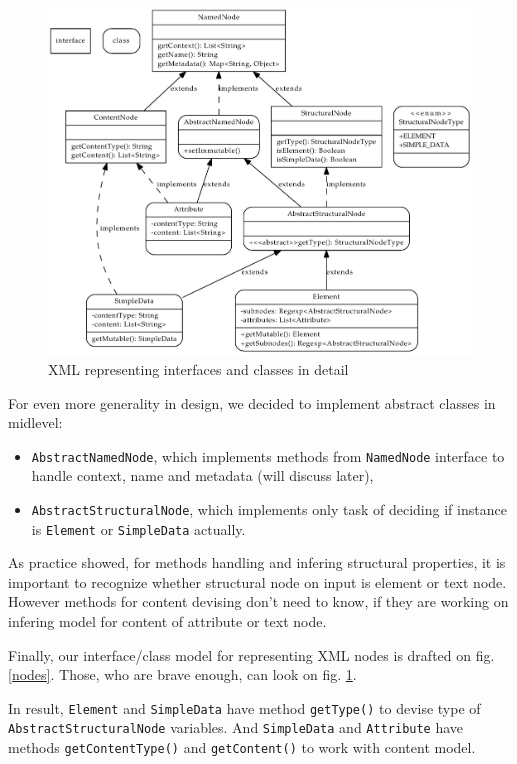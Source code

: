 \documentclass[a4paper,10pt,oneside]{article}
\newcommand{\code}[1]{\texttt{#1}}
\begin{document}
\begin{figure}
\caption{XML representing interfaces and classes in detail} \label{nodes_full}
\centering\includegraphics[scale=0.3]{nodes_full}
\end{figure}

For even more generality in design, we decided to implement abstract classes in midlevel:
\begin{itemize}
	\item \code{AbstractNamedNode}, which implements methods from \code{NamedNode} interface to handle context, name and metadata (will discuss later),
	\item \code{AbstractStructuralNode}, which implements only task of deciding if instance is \code{Element} or \code{SimpleData} actually.
\end{itemize}
As practice showed, for methods handling and infering structural properties, it is important to recognize whether structural node on input is element or text node.
However methods for content devising don't need to know, if they are working on infering model for content of attribute or text node.

Finally, our interface/class model for representing XML nodes is drafted on fig. \ref{nodes}. Those, who are brave enough, can look on fig. \ref{nodes_full}.

In result, \code{Element} and \code{SimpleData} have method \code{getType()} to devise type of \code{AbstractStructuralNode} variables. And \code{SimpleData} and \code{Attribute} have methods \code{getContentType()} and \code{getContent()} to work with content model.
\end{document}
